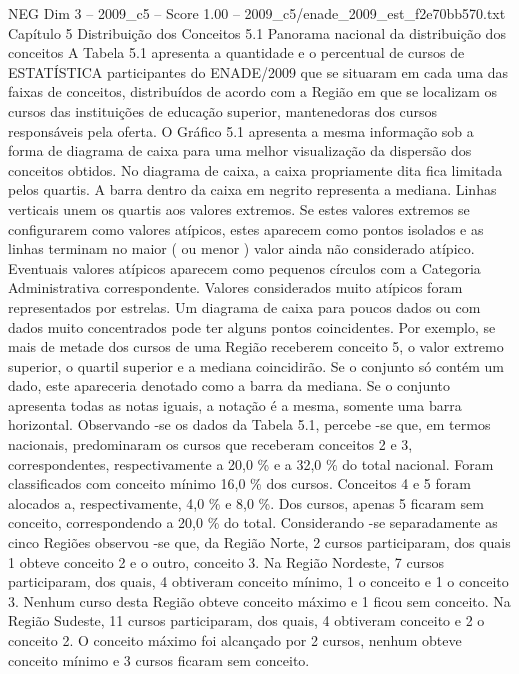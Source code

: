 \begin{textsample}{NEG Dim 3 – 2009\_c5 – Score 1.00 – 2009\_c5/enade\_2009\_est\_f2e70bb570.txt}  \label{ex:f3_neg_111}
Capítulo 5 Distribuição dos Conceitos 5.1 Panorama nacional da distribuição dos conceitos A Tabela 5.1 apresenta a quantidade e o percentual de cursos de ESTATÍSTICA participantes do ENADE/2009 que se situaram em cada uma das faixas de conceitos, distribuídos de acordo com a Região em que se localizam os cursos das instituições de educação superior, mantenedoras dos cursos responsáveis pela oferta.
O Gráfico 5.1 apresenta a mesma informação sob a forma de diagrama de caixa para uma melhor visualização da dispersão dos conceitos obtidos.
No diagrama de caixa, a caixa propriamente dita fica limitada pelos quartis.
A barra dentro da caixa em negrito representa a mediana.
Linhas verticais unem os quartis aos valores extremos.
Se estes valores extremos se configurarem como valores atípicos, estes aparecem como pontos isolados e as linhas terminam no maior ( ou menor ) valor ainda não considerado atípico.
Eventuais valores atípicos aparecem como pequenos círculos com a Categoria Administrativa correspondente.
Valores considerados muito atípicos foram representados por estrelas.
Um diagrama de caixa para poucos dados ou com dados muito concentrados pode ter alguns pontos coincidentes.
Por exemplo, se mais de metade dos cursos de uma Região receberem conceito 5, o valor extremo superior, o quartil superior e a mediana coincidirão.
Se o conjunto só contém um dado, este apareceria denotado como a barra da mediana.
Se o conjunto apresenta todas as notas iguais, a notação é a mesma, somente uma barra horizontal.
Observando -se os dados da Tabela 5.1, percebe -se que, em termos nacionais, predominaram os cursos que receberam conceitos 2 e 3, correspondentes, respectivamente a 20,0 \% e a 32,0 \% do total nacional.
Foram classificados com conceito mínimo 16,0 \% dos cursos.
Conceitos 4 e 5 foram alocados a, respectivamente, 4,0 \% e 8,0 \%.
Dos cursos, apenas 5 ficaram sem conceito, correspondendo a 20,0 \% do total.
Considerando -se separadamente as cinco Regiões observou -se que, da Região Norte, 2 cursos participaram, dos quais 1 obteve conceito 2 e o outro, conceito 3.
Na Região Nordeste, 7 cursos participaram, dos quais, 4 obtiveram conceito mínimo, 1 o conceito e 1 o conceito 3.
Nenhum curso desta Região obteve conceito máximo e 1 ficou sem conceito.
Na Região Sudeste, 11 cursos participaram, dos quais, 4 obtiveram conceito e 2 o conceito 2.
O conceito máximo foi alcançado por 2 cursos, nenhum obteve conceito mínimo e 3 cursos ficaram sem conceito.

\end{textsample}
